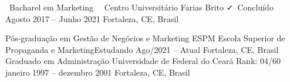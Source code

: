 \cvevent
{\faUserGraduate\ Bacharel em Marketing\ \hfill \faMedal}
{{\ Centro Universitário Farias Brito}
	\hfill \faCheck\ Concluído}
{Agosto 2017 -- Junho 2021}
{Fortaleza, CE, Brasil}
\begin{commentA} \vspace{0.3cm} \noindent 
\vspace{5px}
\cvevent
{\faUserGraduate Pós-graduação em Gestão de Negócios e Marketing}
{ESPM Escola Superior de Propaganda e Marketing\hfill Estudando}
{Ago/2021 -- Atual}
{Fortaleza, CE, Brasil}
\vspace{5px}
\cvevent
{\faUserGraduate Graduado em Administração}
{Universidade de Federal do Ceará \hfill \faCalculator Rank: 04/60}
{janeiro 1997 -- dezembro 2001}
{Fortaleza, CE, Brasil}
\par \vspace{0.1cm} 
\end{commentA}